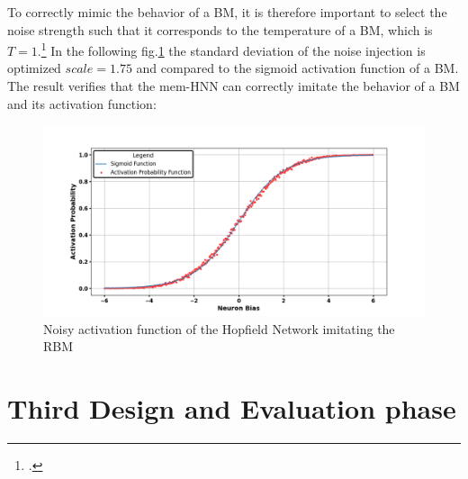 To correctly mimic the behavior of a \ac{BM}, it is therefore important to select the noise strength such that it corresponds to the temperature of a BM, which is \(T=1\).\footcite[cf.][3]{hintonBoltzmannMachines2014}
In the following fig.\ref{Noisy_acitivation_function_good} the standard deviation of the noise injection is optimized \(scale=1.75\) and compared to the sigmoid activation function of a \ac{BM}.
The result verifies that the \ac{mem-HNN} can correctly imitate the behavior of a \ac{BM} and its activation function:
\begin{figure}[H]
    \centering
    \includegraphics[width=1\linewidth]{graphics/Noisy_HNN_2.png}
    \caption{Noisy activation function of the Hopfield Network imitating the \ac{RBM}}
    \label{Noisy_acitivation_function_good}
\end{figure}
\section{Third Design and Evaluation phase}

